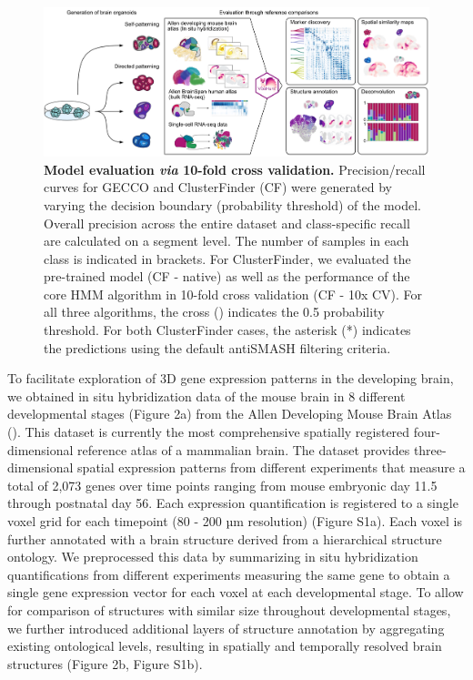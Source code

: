 \begin{figure}[b!]
    \centering
	\includegraphics[width=\textwidth]{figures/voxhunt/Figure_1}
    \caption{\textbf{Model evaluation \textit{via} 10-fold cross validation.} Precision/recall curves for GECCO and ClusterFinder (CF) were generated by varying the decision boundary (probability threshold) of the model. Overall precision across the entire dataset and class-specific recall are calculated on a segment level. The number of samples in each class is indicated in brackets. For ClusterFinder, we evaluated the pre-trained model (CF - native) as well as the performance of the core HMM algorithm in 10-fold cross validation (CF - 10x CV). For all three algorithms, the cross (\texttimes) indicates the 0.5 probability threshold. For both ClusterFinder cases, the asterisk (*) indicates the predictions using the default antiSMASH filtering criteria.}
    \label{fig:vox1}
\end{figure}


To facilitate exploration of 3D gene expression patterns in the developing brain, we obtained in situ hybridization data of the mouse brain in 8 different developmental stages (Figure 2a) from the Allen Developing Mouse Brain Atlas (\cite{thompson_high-resolution_2014}). This dataset is currently the most comprehensive spatially registered four-dimensional reference atlas of a mammalian brain. The dataset provides three-dimensional spatial expression patterns from different experiments that measure a total of 2,073 genes over time points ranging from mouse embryonic day 11.5 through postnatal day 56. Each expression quantification is registered to a single voxel grid for each timepoint (80 - 200 µm resolution) (Figure S1a). Each voxel is further annotated with a brain structure derived from a hierarchical structure ontology. We preprocessed this data by summarizing in situ hybridization quantifications from different experiments measuring the same gene to obtain a single gene expression vector for each voxel at each developmental stage. To allow for comparison of structures with similar size throughout developmental stages, we further introduced additional layers of structure annotation by aggregating existing ontological levels, resulting in spatially and temporally resolved brain structures (Figure 2b, Figure S1b).



